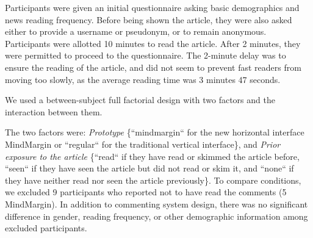 Participants were given an initial questionnaire asking basic demographics and news reading frequency. Before being shown the article, they were also asked either to provide a username or pseudonym, or to remain anonymous. Participants were allotted 10 minutes to read the article. After 2 minutes, they were permitted to proceed to the questionnaire. The 2-minute delay was to ensure the reading of the article, and did not seem to prevent fast readers from moving too slowly, as the average reading time was 3 minutes 47 seconds. 


We used a between-subject full factorial design with two factors and the interaction between them.

The two factors were: {\it Prototype} \{``mindmargin`` for the new horizontal interface MindMargin or ``regular`` for the traditional vertical interface\}, and {\it Prior exposure to the article} \{``read`` if they have read or skimmed the article before, ``seen`` if they have seen the article but did not read or skim it, and ``none`` if they have neither read nor seen the article previously\}. To compare conditions, we excluded 9 participants who reported not to have read the comments (5 MindMargin). In addition to commenting system design, there was no significant difference in gender, reading frequency, or other demographic information among excluded participants.


